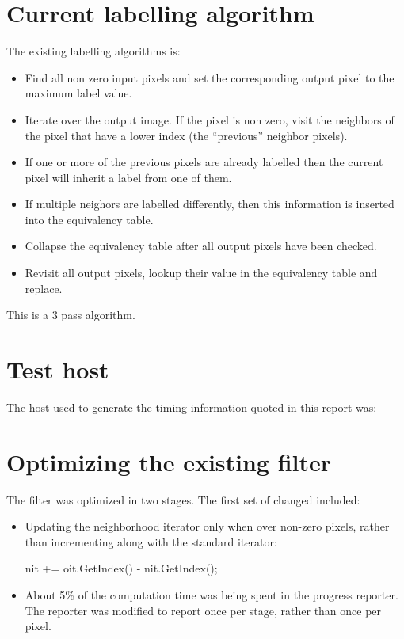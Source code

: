 \documentclass[IJ]{cesj}
\begin{document}
\section{Current labelling algorithm}
The existing labelling algorithms is:
\begin{itemize}
\item Find all non zero input pixels and set the corresponding output 
pixel to the maximum label value.
\item Iterate over the output image. If the pixel is non zero, visit 
the neighbors of the pixel that have a lower index (the ``previous''
neighbor pixels).
\item If one or more of the previous pixels are already labelled 
then the current pixel will inherit a label from one of them.
\item If multiple neighors are labelled differently, then this 
information is inserted into the equivalency table.
\item Collapse the equivalency table after all output pixels have 
been checked.
\item Revisit all output pixels, lookup their value in the equivalency table and replace.
\end{itemize}

This is a 3 pass algorithm.

\section{Test host}
The host used to generate the timing information quoted in this report was:

\section{Optimizing the existing filter}
The filter was optimized in two stages. The first set of changed included:
\begin{itemize}
\item Updating the neighborhood iterator only when over non-zero pixels,
      rather than incrementing along with the standard iterator:
\begin{listing}
nit += oit.GetIndex() - nit.GetIndex(); 
\end{listing}

\item About 5\% of the computation time was being spent in the progress reporter. The reporter was modified to report once per stage, rather than once per pixel.
\end{itemize}
\end{document}
